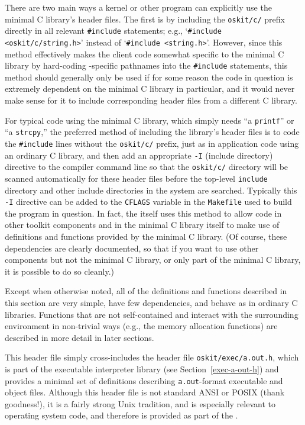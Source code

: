 There are two main ways a kernel or other program
can explicitly use the \oskit{} minimal C library's header files.
The first is by including the {\tt oskit/c/} prefix
directly in all relevant {\tt \#include} statements;
e.g., `{\tt \#include <oskit/c/string.h>}'
instead of `{\tt \#include <string.h>}'.
However, since this method effectively makes the client code
somewhat specific to the \oskit{} minimal C library
by hard-coding \oskit{}-specific pathnames
into the {\tt \#include} statements,
this method should generally only be used
if for some reason the code in question
is extremely dependent on the \oskit{} minimal C library in particular,
and it would never make sense for it to include
corresponding header files from a different C library.

For typical code using the minimal C library,
which simply needs ``a {\tt printf}'' or ``a {\tt strcpy},''
the preferred method of including the library's header files
is to code the {\tt \#include} lines without the {\tt oskit/c/} prefix,
just as in application code using an ordinary C library,
and then add an appropriate {\tt -I} (include directory) directive
to the compiler command line
so that the {\tt oskit/c/} directory will be scanned automatically
for these header files before the top-level {\tt include} directory
and other include directories in the system are searched.
Typically this {\tt -I} directive can be added to the {\tt CFLAGS} variable
in the {\tt Makefile} used to build the program in question.
In fact, the \oskit{} itself uses this method
to allow code in other toolkit components and in the minimal C library itself
to make use of definitions and functions provided by the minimal C library.
(Of course, these dependencies are clearly documented,
so that if you want to use
other \oskit{} components but not the minimal C library,
or only part of the minimal C library,
it is possible to do so cleanly.)

Except when otherwise noted,
all of the definitions and functions described in this section
are very simple, have few dependencies,
and behave as in ordinary C libraries.
Functions that are not self-contained
and interact with the surrounding environment in non-trivial ways
(e.g., the memory allocation functions)
are described in more detail in later sections.

\label{aout-h}
\begin{apidesc}
	This header file simply cross-includes
	the header file \texttt{oskit/exec/a.out.h},
	which is part of the executable interpreter library
	(see Section~\ref{exec-a-out-h})
	and provides a minimal set of definitions
	describing {\tt a.out}-format executable and object files.
	Although this header file
	is not standard ANSI or POSIX (thank goodness!),
	it is a fairly strong Unix tradition,
	and is especially relevant to operating system code,
	and therefore is provided as part of the \oskit{}.
\end{apidesc}


